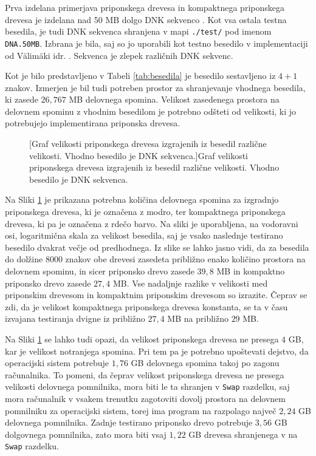 \newpage
Prva izdelana primerjava priponskega drevesa in kompaktnega priponskega drevesa je izdelana nad 50 MB dolgo DNK sekvenco \cite{podatki}. Kot vsa ostala testna besedila, je tudi DNK sekvenca shranjena v mapi \verb|./test/| pod imenom \verb|DNA.50MB|. Izbrana je bila, saj so jo uporabili kot testno besedilo v implementaciji od Välimäki idr. \cite{Valimaki2007}. Sekvenca je zlepek različnih DNK sekvenc.

Kot je bilo predstavljeno v Tabeli \ref{tab:besedila} je besedilo sestavljeno iz $4+1$ znakov. Izmerjen je bil tudi potreben prostor za shranjevanje vhodnega besedila, ki zasede $26,767$ MB delovnega spomina. Velikost zasedenega prostora na delovnem spominu z vhodnim besedilom je potrebno odšteti od velikosti, ki jo potrebujejo implementirana priponska drevesa.

\begin{figure}[htb]
    \centering
    
    [Graf velikosti priponskega drevesa izgrajenih iz besedil različne velikosti. Vhodno besedilo je DNK sekvenca.]{Graf velikosti priponskega drevesa izgrajenih iz besedil različne velikosti. Vhodno besedilo je DNK sekvenca.} 
    \label{fig:VelikostGraf}
\end{figure}

Na Sliki \ref{fig:VelikostGraf} je prikazana potrebna količina delovnega spomina za izgradnjo priponskega drevesa, ki je označena z modro, ter kompaktnega priponskega drevesa, ki pa je označena z rdečo barvo. Na sliki je uporabljena, na vodoravni osi, logaritmična skala za velikost besedila, saj je vsako naslednje testirano besedilo dvakrat večje od predhodnega. Iz slike se lahko jasno vidi, da za besedila do dolžine 8000 znakov obe drevesi zasedeta približno enako količino prostora na delovnem spominu, in sicer priponsko drevo zasede $39,8$ MB in kompaktno priponsko drevo zasede $27,4$ MB. Vse nadaljnje razlike v velikosti med priponskim drevesom in kompaktnim priponskim drevesom so izrazite. Čeprav se zdi, da je velikost kompaktnega priponskega drevesa konstanta, se ta v času izvajana testiranja dvigne iz približno $27,4$ MB na približno $29$ MB.

Na Sliki \ref{fig:VelikostGraf} se lahko tudi opazi, da velikost priponskega drevesa ne presega $4$ GB, kar je velikost notranjega spomina. Pri tem pa je potrebno upoštevati dejstvo, da operacijski sistem potrebuje $1,76$ GB delovnega spomina takoj po zagonu računalnika. To pomeni, da čeprav velikost priponskega drevesa ne presega velikosti delovnega pomnilnika, mora biti le ta shranjen v \verb|Swap| razdelku, saj mora računalnik v vsakem trenutku zagotoviti dovolj prostora na delovnem pomnilniku za operacijski sistem, torej ima program na razpolago največ $2,24$ GB delovnega pomnilnika. Zadnje testirano priponsko drevo potrebuje $3,56$ GB dolgovnega pomnilnika, zato mora biti vsaj $1,22$ GB drevesa shranjenega v na \verb|Swap| razdelku.

